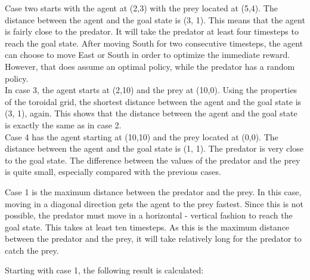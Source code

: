 \documentclass{article}
\begin{document}
Case two starts with the agent at (2,3) with the prey located at (5,4). The distance between the agent and the goal state is (3, 1). This means that the agent is fairly close to the predator. It will take the predator at least four timesteps to reach the goal state. After moving South for two consecutive timesteps, the agent can choose to move East or South in order to optimize the immediate reward. However, that does assume an optimal policy, while the predator has a random policy. \\

In case 3, the agent starts at (2,10) and the prey at (10,0). Using the properties of the toroidal grid, the shortest distance between the agent and the goal state is (3, 1), again. This shows that the distance between the agent and the goal state is exactly the same as in case 2. \\ 

Case 4 has the agent starting at (10,10) and the prey located at (0,0). The distance between the agent and the goal state is (1, 1). The predator is very close to the goal state. The difference between the values of the predator and the prey is quite small, especially compared with the previous cases.  \\

\iffalse

Case 1 is the maximum distance between the predator and the prey. In this case, moving in a diagonal direction gets the agent to the prey fastest. Since this is not possible, the predator must move in a horizontal - vertical fashion to reach the goal state. This takes at least ten timesteps. As this is the maximum distance between the predator and the prey, it will take relatively long for the predator to catch the prey.

Starting with case 1, the following result is calculated:
\end{document}
